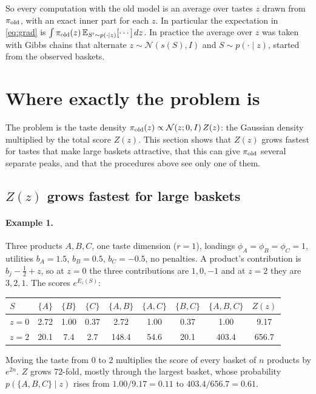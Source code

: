 \documentclass[11pt,a4paper]{article}
\newcommand{\N}{\mathcal N}
\newcommand{\E}{\mathbb E}
\begin{document}
So every computation with the old model is an average over tastes $z$ drawn from $\pi_{\rm old}$, with an exact
inner part for each $z$. In particular the expectation in \eqref{eq:grad} is
$\int\pi_{\rm old}(z)\,\E_{S'\sim p(\cdot\mid z)}[\cdots]\,dz$. In practice the average over $z$ was taken with Gibbs
chains that alternate $z\sim\N(s(S),I)$ and $S\sim p(\cdot\mid z)$, started from the observed baskets.

\section{Where exactly the problem is}\label{part:problem}

The problem is the taste density $\pi_{\rm old}(z)\propto\N(z;0,I)\,Z(z)$: the Gaussian density multiplied by the
total score $Z(z)$. This section shows that $Z(z)$ grows fastest for tastes that make large baskets attractive,
that this can give $\pi_{\rm old}$ several separate peaks, and that the procedures above see only one of them.

\subsection{$Z(z)$ grows fastest for large baskets}

\paragraph{Example 1.} Three products $A,B,C$, one taste dimension ($r=1$), loadings $\phi_A=\phi_B=\phi_C=1$,
utilities $b_A=1.5$, $b_B=0.5$, $b_C=-0.5$, no penalties. A product's contribution is $b_j-\tfrac12+z$, so at $z=0$ the
three contributions are $1,0,-1$ and at $z=2$ they are $3,2,1$. The scores $e^{E_z(S)}$:
\begin{center}\small
\begin{tabular}{lccccccc|c}\toprule
$S$ & $\{A\}$ & $\{B\}$ & $\{C\}$ & $\{A,B\}$ & $\{A,C\}$ & $\{B,C\}$ & $\{A,B,C\}$ & $Z(z)$\\\midrule
$z=0$ & 2.72 & 1.00 & 0.37 & 2.72 & 1.00 & 0.37 & 1.00 & 9.17\\
$z=2$ & 20.1 & 7.4 & 2.7 & 148.4 & 54.6 & 20.1 & 403.4 & 656.7\\\bottomrule
\end{tabular}
\end{center}
Moving the taste from 0 to 2 multiplies the score of every basket of $n$ products by $e^{2n}$. $Z$ grows 72-fold,
mostly through the largest basket, whose probability $p(\{A,B,C\}\mid z)$ rises from $1.00/9.17=0.11$ to
$403.4/656.7=0.61$.
\end{document}
